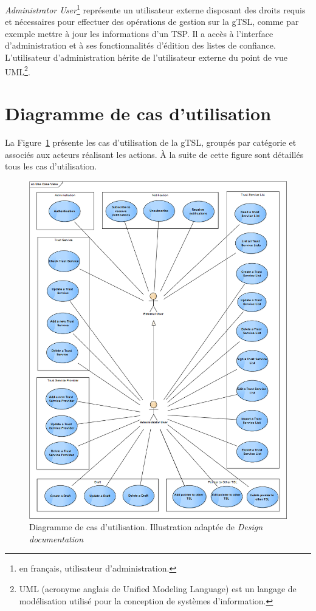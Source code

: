 \documentclass{tnreport}
\begin{document}
\textit{Administrator User}\footnote{en français, utilisateur d'administration.} représente un utilisateur externe disposant des droits requis et nécessaires pour effectuer des opérations de gestion sur la gTSL, comme par exemple mettre à jour les informations d'un TSP. Il a accès à l'interface d'administration et à ses fonctionnalités d'édition des listes de confiance. L'utilisateur d'administration hérite de l'utilisateur externe du point de vue UML\footnote{UML (acronyme anglais de Unified Modeling Language) est un langage de modélisation utilisé pour la conception de systèmes d'information.}.

\section{Diagramme de cas d'utilisation}

La Figure~\ref{fig:use-case-diagram} présente les cas d'utilisation de la gTSL, groupés par catégorie et associés aux acteurs réalisant les actions. À la suite de cette figure sont détaillés tous les cas d'utilisation.

\begin{figure}[h]
	\centering
	\includegraphics[scale=0.53]{figures/use-case-diagram}
	\caption{Diagramme de cas d'utilisation. Illustration adaptée de \textit{Design documentation}~\cite{design-document}}
	\label{fig:use-case-diagram}
\end{figure}
\clearpage
\end{document}
